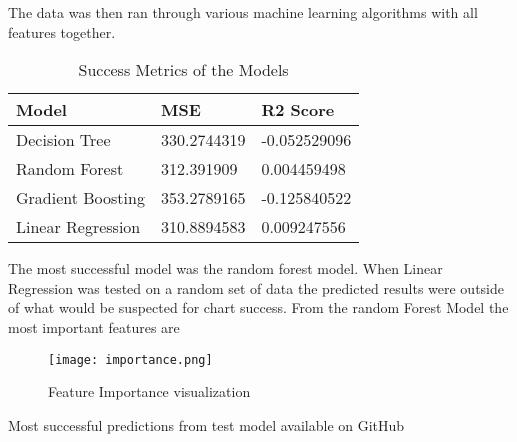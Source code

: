 \documentclass[titlepage]{article}
\begin{document}
The data was then ran through various machine learning algorithms with all features together. 
\begin{table}[H]
    \centering 
    \caption{Success Metrics of the Models}
    \begin{tabular}{lll}
    \hline
        Model & MSE & R2 Score \\ \hline
        Decision Tree & 330.2744319 & -0.052529096 \\ 
        Random Forest & 312.391909 & 0.004459498 \\ 
        Gradient Boosting & 353.2789165 & -0.125840522 \\ 
        Linear Regression & 310.8894583 & 0.009247556 \\ \hline
    \end{tabular}
\end{table} 
\noindent The most successful model was the random forest model. When Linear Regression was tested on a random set of data the predicted results were outside of what would be suspected for chart success. From the random Forest Model the most important features are
\begin{figure}
    \centering 
    \hspace*{-2cm}
    \texttt{[image: importance.png]}
    \caption{Feature Importance visualization}
    \label{fig:enter-label}
\end{figure}  
\noindent Most successful predictions from test model available on GitHub 
\end{document}
